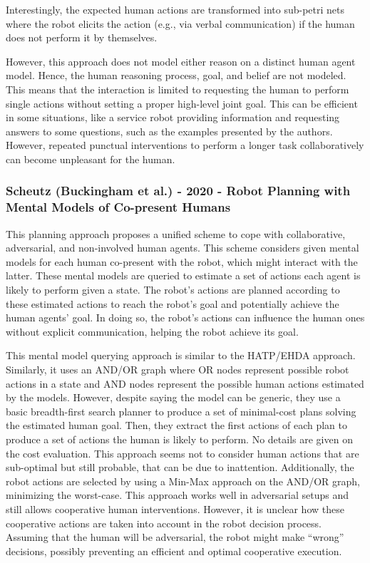 Interestingly, the expected human actions are transformed into sub-petri nets where the robot elicits the action (e.g., via verbal communication) if the human does not perform it by themselves. 

However, this approach does not model either reason on a distinct human agent model. Hence, the human reasoning process, goal, and belief are not modeled. This means that the interaction is limited to requesting the human to perform single actions without setting a proper high-level joint goal. This can be efficient in some situations, like a service robot providing information and requesting answers to some questions, such as the examples presented by the authors. However, repeated punctual interventions to perform a longer task collaboratively can become unpleasant for the human.

\subsubsection{Scheutz (Buckingham et al.) - 2020 - Robot Planning with Mental Models of Co-present Humans}
\label{w4}

\cite{buckingham_robot_2020}

This planning approach proposes a unified scheme to cope with collaborative, adversarial, and non-involved human agents. This scheme considers given mental models for each human co-present with the robot, which might interact with the latter. These mental models are queried to estimate a set of actions each agent is likely to perform given a state. The robot's actions are planned according to these estimated actions to reach the robot's goal and potentially achieve the human agents' goal. In doing so, the robot's actions can influence the human ones without explicit communication, helping the robot achieve its goal.

This mental model querying approach is similar to the HATP/EHDA approach. Similarly, it uses an AND/OR graph where OR nodes represent possible robot actions in a state and AND nodes represent the possible human actions estimated by the models. However, despite saying the model can be generic, they use a basic breadth-first search planner to produce a set of minimal-cost plans solving the estimated human goal. Then, they extract the first actions of each plan to produce a set of actions the human is likely to perform. No details are given on the cost evaluation. This approach seems not to consider human actions that are sub-optimal but still probable, that can be due to inattention. Additionally, the robot actions are selected by using a Min-Max approach on the AND/OR graph, minimizing the worst-case. This approach works well in adversarial setups and still allows cooperative human interventions. However, it is unclear how these cooperative actions are taken into account in the robot decision process. Assuming that the human will be adversarial, the robot might make ``wrong'' decisions, possibly preventing an efficient and optimal cooperative execution.

